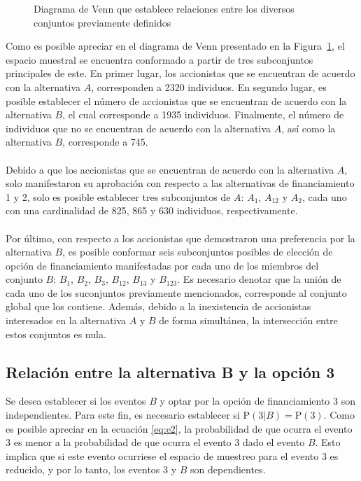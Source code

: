 \documentclass[paper=letterpaper]{article}
\begin{document}
\begin{figure}
\centering
{}
\caption{Diagrama de Venn que establece relaciones entre los diversos conjuntos previamente definidos}
\label{Fig:F1}
\end{figure}

Como es posible apreciar en el diagrama de Venn presentado en la Figura~\ref{Fig:F1}, el espacio muestral se encuentra conformado a partir de tres subconjuntos principales de este. En primer lugar, los accionistas que se encuentran de acuerdo con la alternativa $A$, corresponden a 2320 individuos. En segundo lugar, es posible establecer el número de accionistas que se encuentran de acuerdo con la alternativa $B$, el cual corresponde a 1935 individuos. Finalmente, el número de individuos que no se encuentran de acuerdo con la alternativa $A$, as\'{i} como la alternativa $B$, corresponde a 745.
\\
\\
Debido a que los accionistas que se encuentran de acuerdo con la alternativa $A$, solo manifestaron su aprobaci\'{o}n con respecto a las alternativas de financiamiento 1 y 2, solo es posible establecer tres subconjuntos de $A$: $A_1$, $A_{12}$ y $A_{2}$, cada uno con una cardinalidad de 825, 865 y 630 individuos, respectivamente.
\\
\\
Por último, con respecto a los accionistas que demostraron una preferencia por la alternativa $B$, es posible conformar seis subconjuntos posibles de elección de opción de financiamiento manifestadas por cada uno de los miembros del conjunto $B$: $B_1$, $B_2$, $B_3$, $B_{12}$, $B_{13}$ y $B_{123}$. Es necesario denotar que la uni\'{o}n de cada uno de los suconjuntos previamente mencionados, corresponde al conjunto global que los contiene. Adem\'{a}s, debido a la inexistencia de accionistas interesados en la alternativa $A$ y $B$ de forma simult\'{a}nea, la intersecci\'{o}n entre estos conjuntos es nula.  
\\

\subsection{Relaci\'{o}n entre la alternativa B y la opci\'{o}n 3}
Se desea establecer si los eventos $B$ y optar por la opci\'{o}n de financiamiento 3 son independientes. Para este fin, es necesario establecer si $\mathrm{P}(3 \vert B) = \mathrm{P}(3)$. Como es posible apreciar en la ecuaci\'{o}n \eqref{eq:e2}, la probabilidad de que ocurra el evento 3 es menor a la probabilidad de que ocurra el evento 3 dado el evento $B$. Esto implica que si este evento ocurriese el espacio de muestreo para el evento 3 es reducido, y por lo tanto, los eventos 3 y $B$ son dependientes.
\end{document}
